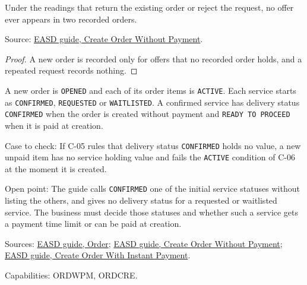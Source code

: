 \begin{theorem}
  \label{thm:order-creation-once-per-offer-of-ne}
  Under the readings that return the existing order or reject the request, no
  offer ever appears in two recorded orders.

  Source: \href{https://standards.atlassian.net/wiki/spaces/EASD/pages/574455879/Create+Order+Without+Payment}{EASD guide, Create Order Without Payment}.
\end{theorem}
\begin{proof}
  A new order is recorded only for offers that no recorded order holds, and a
  repeated request records nothing.
\end{proof}

\begin{theorem}
  \label{thm:order-creation-new-order-state}
  \notready
  A new order is \texttt{OPENED} and each of its order items is
  \texttt{ACTIVE}. Each service starts as \texttt{CONFIRMED},
  \texttt{REQUESTED} or \texttt{WAITLISTED}. A confirmed service has
  delivery status \texttt{CONFIRMED} when the order is created without
  payment and \texttt{READY TO PROCEED} when it is paid at creation.

  Case to check: If C-05 rules that delivery status \texttt{CONFIRMED} holds
  no value, a new unpaid item has no service holding value and fails the
  \texttt{ACTIVE} condition of C-06 at the moment it is created.

  Open point: The guide calls \texttt{CONFIRMED} one of the initial service
  statuses without listing the others, and gives no delivery status for a
  requested or waitlisted service. The business must decide those statuses
  and whether such a service gets a payment time limit or can be paid at
  creation.

  Sources: \href{https://standards.atlassian.net/wiki/spaces/EASD/pages/574849062/Order}{EASD guide, Order};
  \href{https://standards.atlassian.net/wiki/spaces/EASD/pages/574455879/Create+Order+Without+Payment}{EASD guide, Create Order Without Payment};
  \href{https://standards.atlassian.net/wiki/spaces/EASD/pages/574619727/Create+Order+With+Instant+Payment}{EASD guide, Create Order With Instant Payment}.

  Capabilities: ORDWPM, ORDCRE.
\end{theorem}

